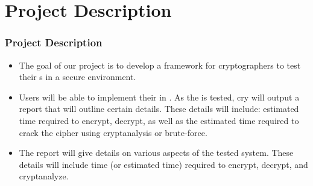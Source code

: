 \section{Project Description}


\begin{frame}
\frametitle{Project Description}
\begin{itemize}
\item The goal of our project is to develop a framework for
  cryptographers to test their \cs s in a
  secure environment.
\item Users will be able to implement their
  \cs{} in \cry. As the \cs{} is tested, cry will
  output a report that will outline certain details.
  These details will include: estimated time required to
  encrypt, decrypt, as well as the estimated time required
  to crack the cipher using cryptanalysis or brute-force.
\item The report will give details on various aspects of the
  tested system. These details will include time (or
  estimated time) required to encrypt, decrypt, and
  cryptanalyze.
\end{itemize}
\end{frame}
